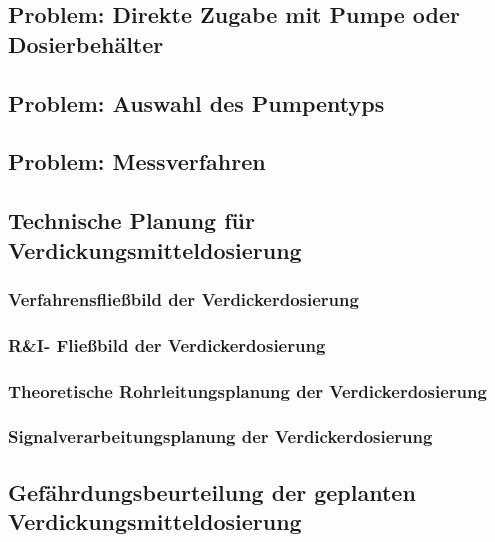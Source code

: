 \subsection{Problem: Direkte Zugabe mit Pumpe oder Dosierbehälter}

\subsection{Problem: Auswahl des Pumpentyps}


\subsection{Problem: Messverfahren}

\subsection{Technische Planung für Verdickungsmitteldosierung}
\subsubsection{Verfahrensfließbild der Verdickerdosierung}
\subsubsection{R\&I- Fließbild der Verdickerdosierung}
\subsubsection{Theoretische Rohrleitungsplanung der Verdickerdosierung}

\subsubsection{Signalverarbeitungsplanung der Verdickerdosierung}

\subsection{Gefährdungsbeurteilung der geplanten Verdickungsmitteldosierung}



